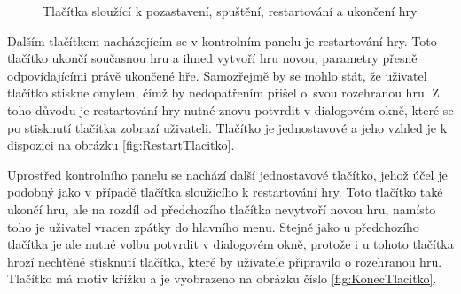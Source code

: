 \begin{figure}
	\centering
	\hspace{2em} %
	\hspace{2em} %
	\hspace{2em} %
	\caption{Tlačítka sloužící k pozastavení, spuštění, restartování a ukončení hry}
	\label{fig:Tlacitka1}
\end{figure}

Dalším tlačítkem nacházejícím se v kontrolním panelu je restartování hry. Toto tlačítko ukončí současnou hru a ihned vytvoří hru novou, parametry přesně odpovídajícími právě ukončené hře. Samozřejmě by se mohlo stát, že uživatel tlačítko stiskne omylem, čímž by nedopatřením přišel o~svou rozehranou hru. Z toho důvodu je restartování hry nutné znovu potvrdit v dialogovém okně, které se po stisknutí tlačítka zobrazí uživateli. Tlačítko je jednostavové a jeho vzhled je k dispozici na obrázku \ref{fig:RestartTlacitko}.

Uprostřed kontrolního panelu se nachází další jednostavové tlačítko, jehož účel je podobný jako v případě tlačítka sloužícího k restartování hry. Toto tlačítko také ukončí hru, ale na rozdíl od předchozího tlačítka nevytvoří novou hru, namísto toho je uživatel vracen zpátky do hlavního menu. Stejně jako u předchozího tlačítka je ale nutné volbu potvrdit v dialogovém okně, protože i u tohoto tlačítka hrozí nechtěné stisknutí tlačítka, které by uživatele připravilo o rozehranou hru. Tlačítko má motiv křížku a je vyobrazeno na obrázku číslo \ref{fig:KonecTlacitko}.

